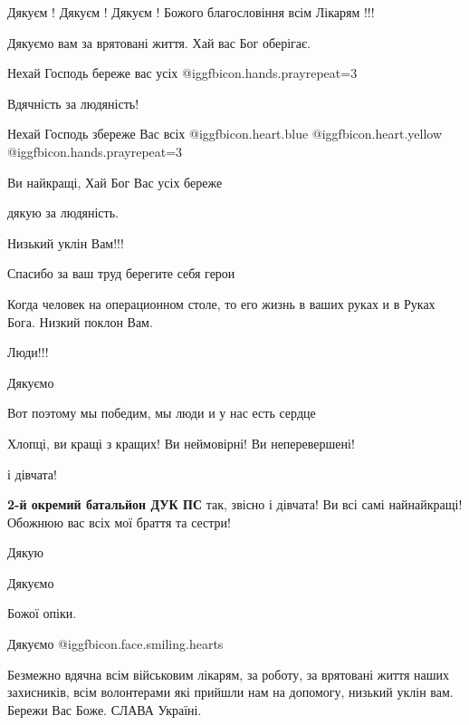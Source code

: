 \begin{itemize}
Дякуєм ! Дякуєм ! Дякуєм ! Божого благословіння всім Лікарям !!!

Дякуємо вам за врятовані життя. Хай вас Бог оберігає.

Нехай Господь береже вас усіх @igg{fbicon.hands.pray}{repeat=3} 

Вдячність за людяність!

Нехай Господь збереже Вас всіх @igg{fbicon.heart.blue}  @igg{fbicon.heart.yellow}  @igg{fbicon.hands.pray}{repeat=3} 

Ви найкращі, Хай Бог Вас усіх береже

дякую за людяність.

Низький уклін Вам!!!

Спасибо за ваш труд берегите себя герои

Когда человек на операционном столе, то его жизнь в ваших руках и в Руках Бога. Низкий поклон Вам.

Люди!!!

Дякуємо

Вот поэтому мы победим, мы люди и у нас есть сердце

Хлопці, ви кращі з кращих!
Ви неймовірні!
Ви неперевершені!

\begin{itemize} %
і дівчата!

\textbf{2-й окремий батальйон ДУК ПС} так, звісно і дівчата! Ви всі самі найнайкращі! Обожнюю вас всіх мої браття та сестри!
\end{itemize} %

Дякую

Дякуємо

Божої опіки.

Дякуємо @igg{fbicon.face.smiling.hearts} 


Безмежно вдячна всім військовим лікарям, за роботу, за врятовані життя наших
захисників, всім волонтерами які прийшли нам на допомогу, низький уклін вам.
Бережи Вас Боже. СЛАВА Україні.



\end{itemize}
